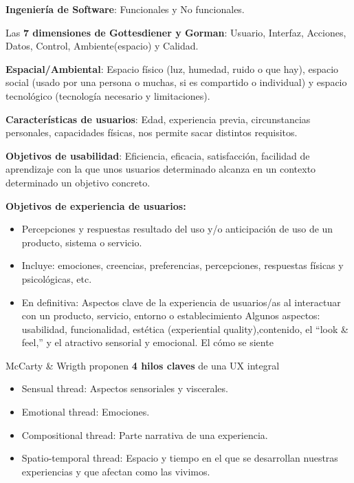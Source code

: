 \documentclass[12pt]{report} %
\begin{document}
\textbf{Ingeniería de Software}: Funcionales y No funcionales.

Las \textbf{7 dimensiones de Gottesdiener y Gorman}: Usuario, Interfaz,
Acciones, Datos, Control, Ambiente(espacio) y Calidad.

\textbf{Espacial/Ambiental}: Espacio físico (luz, humedad, ruido o que
hay), espacio social (usado por una persona o muchas, si es compartido o
individual) y espacio tecnológico (tecnología necesario y limitaciones).

\textbf{Características de usuarios}: Edad, experiencia previa,
circunstancias personales, capacidades físicas, nos permite sacar
distintos requisitos.

\textbf{Objetivos de usabilidad}: Eficiencia, eficacia, satisfacción,
facilidad de aprendizaje con la que unos usuarios determinado alcanza en
un contexto determinado un objetivo concreto.

\textbf{Objetivos de experiencia de usuarios:}

\begin{itemize}

\item
  Percepciones y respuestas resultado del uso y/o anticipación de uso de
  un producto, sistema o servicio.
\item
  Incluye: emociones, creencias, preferencias, percepciones, respuestas
  físicas y psicológicas, etc.
\item
  En definitiva: Aspectos clave de la experiencia de usuarios/as al
  interactuar con un producto, servicio, entorno o establecimiento
  Algunos aspectos: usabilidad, funcionalidad, estética (experiential
  quality),contenido, el ``look \& feel,'' y el atractivo sensorial y
  emocional. El cómo se siente
\end{itemize}

McCarty \& Wrigth proponen \textbf{4 hilos claves} de una UX integral

\begin{itemize}

\item
  Sensual thread: Aspectos sensoriales y viscerales.
\item
  Emotional thread: Emociones.
\item
  Compositional thread: Parte narrativa de una experiencia.
\item
  Spatio-temporal thread: Espacio y tiempo en el que se desarrollan
  nuestras experiencias y que afectan como las vivimos.
\end{itemize}
\end{document}
